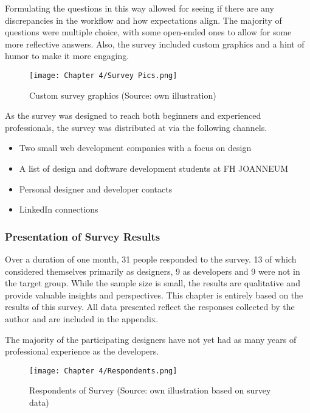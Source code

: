 Formulating the questions in this way allowed for seeing if there are any discrepancies in the
workflow and how expectations align. The majority of questions were multiple choice, with some
open-ended ones to allow for some more reflective answers. Also, the survey included custom graphics
and a hint of humor to make it more engaging.
\begin{figure}[H]
    \centering
    \texttt{[image: Chapter 4/Survey Pics.png]}
    \caption{Custom survey graphics (Source: own illustration)}
\end{figure}

As the survey was designed to reach both beginners and experienced professionals, the survey was
distributed at via the following channels.
\begin{itemize}
    \item Two small web development companies with a focus on design
    \item A list of design and doftware development students at FH JOANNEUM
    \item Personal designer and developer contacts
    \item LinkedIn connections
\end{itemize}

\subsubsection{Presentation of Survey Results}
Over a duration of one month, 31 people responded to the survey. 13 of which considered themselves
primarily as designers, 9 as developers and 9 were not in the target group. While the sample size is
small, the results are qualitative and provide valuable insights and perspectives. This chapter is
entirely based on the results of this survey. All data presented reflect the responses collected by
the author and are included in the appendix.

The majority of the participating designers have not yet had as many years of professional
experience as the developers.
\begin{figure}[H]
    \centering
    \texttt{[image: Chapter 4/Respondents.png]}
    \caption{Respondents of Survey (Source: own illustration based on survey data)}
\end{figure}

